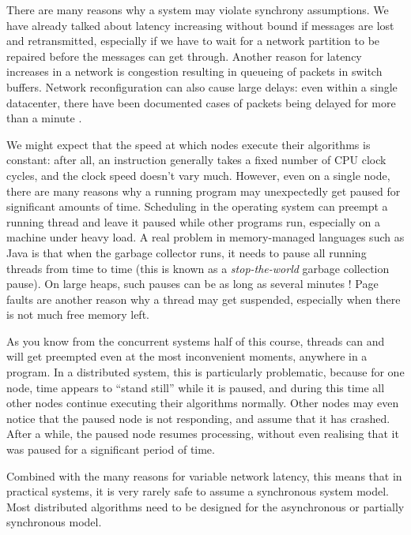 There are many reasons why a system may violate synchrony assumptions.
We have already talked about latency increasing without bound if messages are lost and retransmitted, especially if we have to wait for a network partition to be repaired before the messages can get through.
Another reason for latency increases in a network is congestion resulting in queueing of packets in switch buffers.
Network reconfiguration can also cause large delays: even within a single datacenter, there have been documented cases of packets being delayed for more than a minute \citep{Imbriaco:2012tx}.

We might expect that the speed at which nodes execute their algorithms is constant: after all, an instruction generally takes a fixed number of CPU clock cycles, and the clock speed doesn't vary much.
However, even on a single node, there are many reasons why a running program may unexpectedly get paused for significant amounts of time.
Scheduling in the operating system can preempt a running thread and leave it paused while other programs run, especially on a machine under heavy load.
A real problem in memory-managed languages such as Java is that when the garbage collector runs, it needs to pause all running threads from time to time (this is known as a \emph{stop-the-world} garbage collection pause).
On large heaps, such pauses can be as long as several minutes \citep{Thompson:2013}!
Page faults are another reason why a thread may get suspended, especially when there is not much free memory left.

As you know from the concurrent systems half of this course, threads can and will get preempted even at the most inconvenient moments, anywhere in a program.
In a distributed system, this is particularly problematic, because for one node, time appears to ``stand still'' while it is paused, and during this time all other nodes continue executing their algorithms normally.
Other nodes may even notice that the paused node is not responding, and assume that it has crashed.
After a while, the paused node resumes processing, without even realising that it was paused for a significant period of time.

Combined with the many reasons for variable network latency, this means that in practical systems, it is very rarely safe to assume a synchronous system model.
Most distributed algorithms need to be designed for the asynchronous or partially synchronous model.


